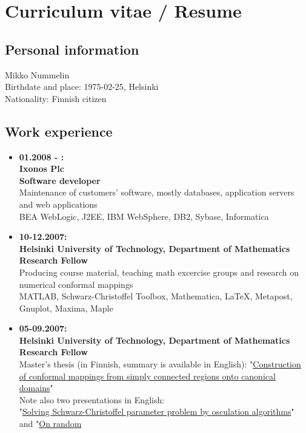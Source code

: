 \documentclass[a4paper,12pt]{article}
\begin{document}
\section*{Curriculum vitae / Resume}

\subsection*{Personal information}
Mikko Nummelin \\
Birthdate and place: 1975-02-25, Helsinki \\
Nationality: Finnish citizen

\subsection*{Work experience}
\begin{itemize}
\item
{\bf 01.2008 - :\\
Ixonos Plc \\
Software developer} \\
Maintenance of customers' software, mostly databases, application servers and web applications \\
BEA WebLogic, J2EE, IBM WebSphere, DB2, Sybase, Informatica
\item
{\bf 10-12.2007:\\
Helsinki University of Technology, Department of Mathematics \\
Research Fellow} \\
Producing course material, teaching math excercise groups and
research on numerical conformal mappings \\
MATLAB, Schwarz-Christoffel Toolbox, Mathematica, LaTeX, Metapost, Gnuplot,
Maxima, Maple
\item
{\bf 05-09.2007:\\
Helsinki University of Technology, Department of Mathematics \\
Research Fellow} \\
Master's thesis (in Finnish, summary is available in English): "\href{http://math.tkk.fi/~mnummeli/tutkimus/diplomityo.pdf}
{Construction of conformal mappings from simply connected regions onto
canonical domains}" \\
Note also two presentations in English: \\
"\href{http://math.tkk.fi/~mnummeli/tutkimus/esitelma071015.pdf}{Solving Schwarz-Christoffel parameter problem by osculation algorithms}" and
"\href{http://math.tkk.fi/~mnummeli/tutkimus/esitelma071024.pdf}{On random
}
\end{itemize}
\end{document}
